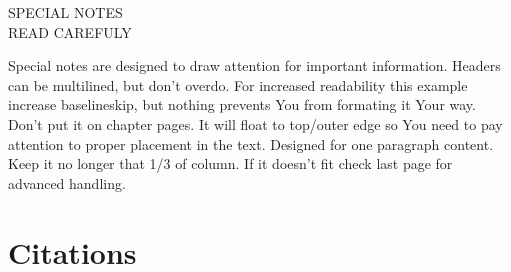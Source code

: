 \documentclass[10pt,a4paper,twoside,twocolumn,openany]{book}
\begin{document}
    
    
    \newpage
	
    \placetopbox{}
    \begin{custombox}[]
    	\def\FrameCommand{%
        	\fboxsep=\FrameSep%
    	    \colorbox{baseColor}%
    	}%
        \begin{framed}
    	    {\color{white}%
    		\centering %
    		\Large
    		\MakeUppercase{Special Notes\\Read Carefuly}
    		\par}%
    	    \normalsize
    	    \raggedright
    	    
    	    \vspace{4pt}
    	
    		\begin{center}
        		\parbox{\dimexpr\linewidth-20pt\relax}{%
    	    		\setlength{\baselineskip}{1.5\baselineskip}%
    		    	\color{white}
    			    Special notes are designed to draw attention for important information.
    			    Headers can be multilined, but don't overdo. For increased readability 
    			    this example increase baselineskip, but nothing prevents You from formating it Your way. Don't put it on chapter pages. It will float to top/outer edge so You need to pay attention to proper placement in the text. Designed for one paragraph content. Keep it no longer that 1/3 of column. If it doesn't fit check last page for advanced handling.
    		    }
            \end{center}
    	
        \end{framed}
    \end{custombox}
    
    \section{Citations}
\end{document}
